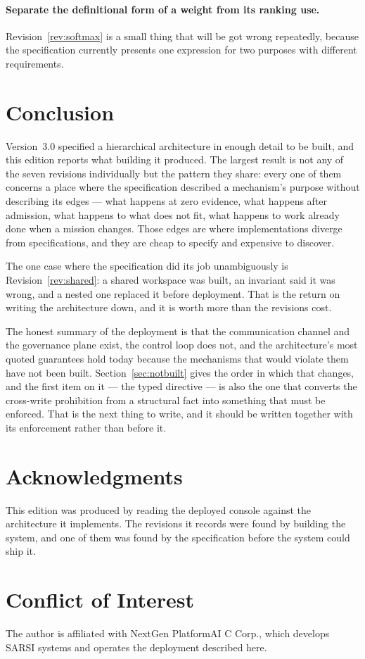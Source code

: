 \documentclass[11pt]{article}
\begin{document}
\paragraph{Separate the definitional form of a weight from its ranking use.} Revision~\ref{rev:softmax} is a small thing that will be got wrong repeatedly, because the specification currently presents one expression for two purposes with different requirements.

\section{Conclusion}
\label{sec:conclusion}

Version~3.0 specified a hierarchical architecture in enough detail to be built, and this edition reports what building it produced. The largest result is not any of the seven revisions individually but the pattern they share: every one of them concerns a place where the specification described a mechanism's purpose without describing its edges --- what happens at zero evidence, what happens after admission, what happens to what does not fit, what happens to work already done when a mission changes. Those edges are where implementations diverge from specifications, and they are cheap to specify and expensive to discover.

The one case where the specification did its job unambiguously is Revision~\ref{rev:shared}: a shared workspace was built, an invariant said it was wrong, and a nested one replaced it before deployment. That is the return on writing the architecture down, and it is worth more than the revisions cost.

The honest summary of the deployment is that the communication channel and the governance plane exist, the control loop does not, and the architecture's most quoted guarantees hold today because the mechanisms that would violate them have not been built. Section~\ref{sec:notbuilt} gives the order in which that changes, and the first item on it --- the typed directive --- is also the one that converts the cross-write prohibition from a structural fact into something that must be enforced. That is the next thing to write, and it should be written together with its enforcement rather than before it.

\section*{Acknowledgments}
This edition was produced by reading the deployed console against the architecture it implements. The revisions it records were found by building the system, and one of them was found by the specification before the system could ship it.

\section*{Conflict of Interest}
The author is affiliated with NextGen PlatformAI C Corp., which develops SARSI systems and operates the deployment described here.



\end{document}
